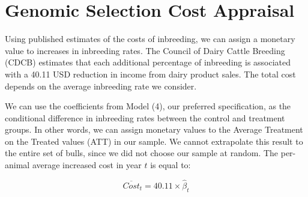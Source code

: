 \documentclass[12pt,letterpaper]{article}
\begin{document}


\newpage

\clearpage

\appendix


\section{Genomic Selection Cost Appraisal\label{sec:cost}}
Using published estimates of the costs of inbreeding, we can assign a monetary value to increases in inbreeding rates. The Council of Dairy Cattle Breeding (CDCB) estimates that each additional percentage of inbreeding is associated with a 40.11 USD reduction in income from dairy product sales. The total cost depends on the average inbreeding rate we consider.
 
We can use the coefficients from Model (4), our preferred specification, as the conditional difference in inbreeding rates between the control and treatment groups. In other words, we can assign monetary values to the Average Treatment on the Treated values (ATT) in our sample. We cannot extrapolate this result to the entire set of bulls, since we did not choose our sample at random. The per-animal average increased cost in year $t$ is equal to:

\begin{equation}
    \overline{Cost}_{t} = 40.11\times\hat{\beta}_{t}
\end{equation}
\end{document}
